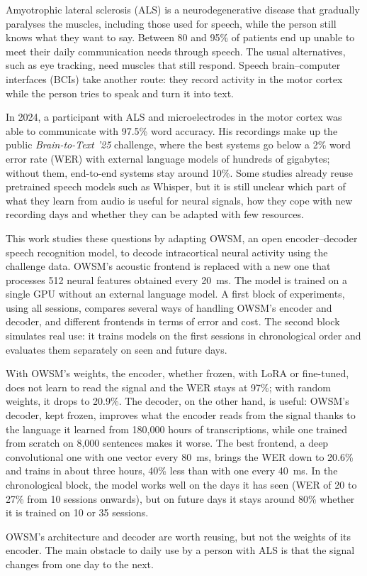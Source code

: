 
Amyotrophic lateral sclerosis (ALS) is a neurodegenerative disease that gradually paralyses the
muscles, including those used for speech, while the person still knows what they want to say.
Between 80 and 95\% of patients end up unable to meet their daily communication needs through
speech. The usual alternatives, such as eye tracking, need muscles that still respond. Speech
brain--computer interfaces (BCIs) take another route: they record activity in the motor cortex
while the person tries to speak and turn it into text.

In 2024, a participant with ALS and microelectrodes in the motor cortex was able to communicate
with 97.5\% word accuracy. His recordings make up the public \textit{Brain-to-Text '25}
challenge, where the best systems go below a 2\% word error rate (WER) with external language
models of hundreds of gigabytes; without them, end-to-end systems stay around 10\%. Some studies
already reuse pretrained speech models such as Whisper, but it is still unclear which part of
what they learn from audio is useful for neural signals, how they cope with new recording days
and whether they can be adapted with few resources.

This work studies these questions by adapting OWSM, an open encoder--decoder speech recognition
model, to decode intracortical neural activity using the challenge data. OWSM's acoustic
frontend is replaced with a new one that processes 512 neural features obtained every 20~ms.
The model is trained on a single GPU without an external language model. A first block of
experiments, using all sessions, compares several ways of handling OWSM's encoder and decoder,
and different frontends in terms of error and cost. The second block simulates real use: it
trains models on the first sessions in chronological order and evaluates them separately on
seen and future days.

With OWSM's weights, the encoder, whether frozen, with LoRA or fine-tuned, does not learn to
read the signal and the WER stays at 97\%; with random weights, it drops to 20.9\%. The decoder,
on the other hand, is useful: OWSM's decoder, kept frozen, improves what the encoder reads from
the signal thanks to the language it learned from 180,000 hours of transcriptions, while one
trained from scratch on 8,000 sentences makes it worse. The best
frontend, a deep convolutional one with one vector every 80~ms, brings the WER down to 20.6\%
and trains in about three hours, 40\% less than with one every 40~ms. In the chronological
block, the model works well on the days it has seen (WER of 20 to 27\% from 10 sessions
onwards), but on future days it stays around 80\% whether it is trained on 10 or 35 sessions.

OWSM's architecture and decoder are worth reusing, but not the weights of its encoder. The main
obstacle to daily use by a person with ALS is that the signal changes from one day to the next.
